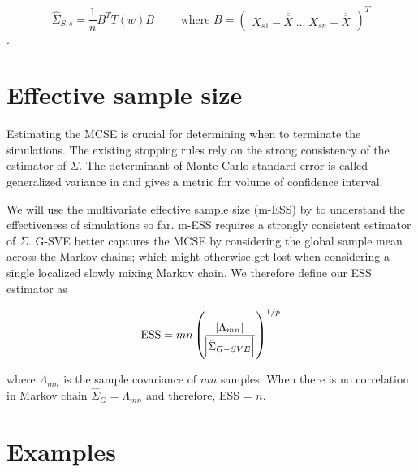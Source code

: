 \documentclass[11pt]{article}
\theoremstyle{remark}
\begin{document}
\[
\hat{\Sigma}_{S,s} = \dfrac{1}{n}B^T T(w) B \qquad \textrm{ where } B = 
\begin{pmatrix}
    X_{s1} - \overline{\overline{X}} \; \dots \; X_{sn} - \overline{\overline{X}}
\end{pmatrix}^T
\].


\section{Effective sample size} \label{sec:ess}

Estimating the MCSE is crucial for determining when to terminate the simulations. The existing stopping rules rely on the strong consistency of the estimator of $\Sigma$. The determinant of Monte Carlo standard error is called generalized variance in  \cite{wilks1932certain} and gives a metric for volume of confidence interval. 

We will use the multivariate effective sample size (m-ESS) by \cite{vats2019multivariate} to understand the effectiveness of simulations so far. m-ESS requires a strongly consistent estimator of $\Sigma$. G-SVE better captures the MCSE by considering the global sample mean across the Markov chains; which might otherwise get lost when considering a single localized slowly mixing Markov chain. We therefore define our ESS estimator as

\[
\text{ESS} = mn\left(\dfrac{\abs{\Lambda_{mn}}}{\abs{\hat{\Sigma}_{G-SVE}}}\right)^{1/p}
\]

where $\Lambda_{mn}$ is the sample covariance of $mn$ samples. When there is no correlation in Markov chain $\hat{\Sigma}_{G} = \Lambda_{mn}$ and therefore, ESS = $n$. 

\section{Examples} \label{sec:examples}
\end{document}
